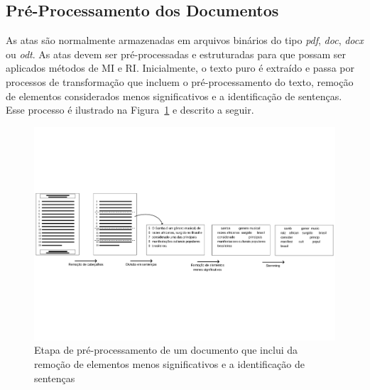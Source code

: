 \subsection{Pré-Processamento dos Documentos}

As atas são normalmente armazenadas em arquivos binários do tipo \textit{pdf}, \textit{doc}, \textit{docx} ou \textit{odt}. As atas devem ser pré-processadas e estruturadas para que possam ser aplicados métodos de MI e RI. Inicialmente, o texto puro é extraído e passa por processos de transformação que incluem o pré-processamento do texto, remoção de elementos considerados menos significativos e a identificação de sentenças. Esse processo é ilustrado na Figura~\ref{fig:preprocessamento-segmentacao} e descrito a seguir.

	

\begin{center}
	\begin{figure}[h!]

	\includegraphics[trim={ 0 180 0 180 },clip,page=1,width=\textwidth]{conteudo/capitulos/figs/pre-process.pdf}

	\caption{Etapa de pré-processamento de um documento que inclui da remoção de elementos menos significativos e a identificação de sentenças}
	\label{fig:preprocessamento-segmentacao}
	\end{figure}
\end{center}



